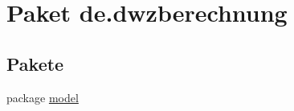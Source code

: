 \hypertarget{namespacede_1_1dwzberechnung}{}\section{Paket de.\+dwzberechnung}
\label{namespacede_1_1dwzberechnung}
\subsection*{Pakete}
\begin{DoxyCompactItemize}
\item 
package \hyperlink{namespacede_1_1dwzberechnung_1_1model}{model}
\end{DoxyCompactItemize}
